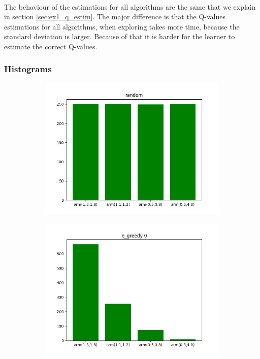 \documentclass[letterpaper]{article}
\begin{document}
\paragraph{}

The behaviour of the estimations for all algorithms are the same
that we explain in section \ref{sec:ex1_q_estim}. The major difference
is that the Q-values estimations for all algorithms, when exploring
takes more time, because the standard deviation is larger. Because of
that it is harder for the learner to estimate the correct Q-values.


\subsubsection{Histograms}


\begin{figure}[H]
  \begin{subfigure}{.5\textwidth}
    \centering
    \includegraphics[width=1\linewidth]{images/assign3/ex2/arms_random}
    \caption{}
    \label{fig:arms_random_ex2}
  \end{subfigure}
  \begin{subfigure}{.5\textwidth}
    \centering
    \includegraphics[width=1\linewidth]{images/assign3/ex2/arms_e_greedy0}

\end{subfigure}
\end{figure}
\end{document}
